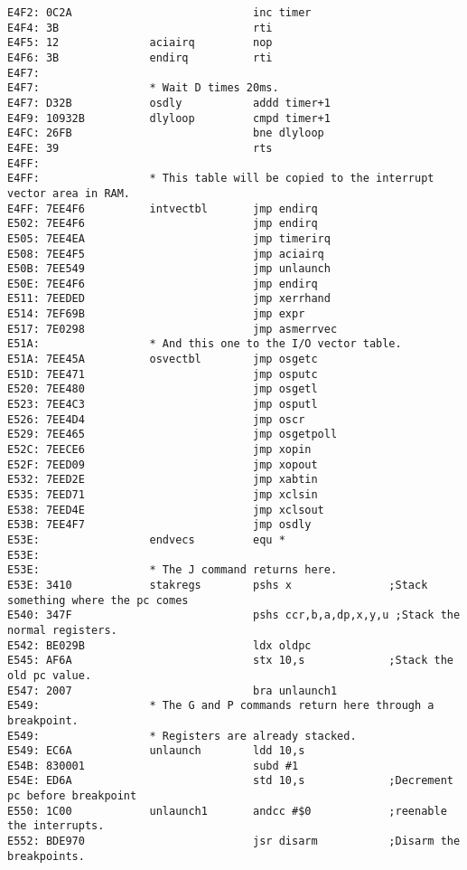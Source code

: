 {\begin{verbatim}
E4F2: 0C2A                            inc timer
E4F4: 3B                              rti
E4F5: 12              aciairq         nop
E4F6: 3B              endirq          rti
E4F7:                 
E4F7:                 * Wait D times 20ms.
E4F7: D32B            osdly           addd timer+1
E4F9: 10932B          dlyloop         cmpd timer+1
E4FC: 26FB                            bne dlyloop
E4FE: 39                              rts             
E4FF:                 
E4FF:                 * This table will be copied to the interrupt vector area in RAM.
E4FF: 7EE4F6          intvectbl       jmp endirq
E502: 7EE4F6                          jmp endirq
E505: 7EE4EA                          jmp timerirq
E508: 7EE4F5                          jmp aciairq
E50B: 7EE549                          jmp unlaunch
E50E: 7EE4F6                          jmp endirq
E511: 7EEDED                          jmp xerrhand
E514: 7EF69B                          jmp expr
E517: 7E0298                          jmp asmerrvec
E51A:                 * And this one to the I/O vector table.
E51A: 7EE45A          osvectbl        jmp osgetc
E51D: 7EE471                          jmp osputc
E520: 7EE480                          jmp osgetl
E523: 7EE4C3                          jmp osputl
E526: 7EE4D4                          jmp oscr                
E529: 7EE465                          jmp osgetpoll
E52C: 7EECE6                          jmp xopin
E52F: 7EED09                          jmp xopout
E532: 7EED2E                          jmp xabtin
E535: 7EED71                          jmp xclsin
E538: 7EED4E                          jmp xclsout
E53B: 7EE4F7                          jmp osdly
E53E:                 endvecs         equ *           
E53E:                                 
E53E:                 * The J command returns here.
E53E: 3410            stakregs        pshs x               ;Stack something where the pc comes
E540: 347F                            pshs ccr,b,a,dp,x,y,u ;Stack the normal registers.
E542: BE029B                          ldx oldpc       
E545: AF6A                            stx 10,s             ;Stack the old pc value.
E547: 2007                            bra unlaunch1
E549:                 * The G and P commands return here through a breakpoint.
E549:                 * Registers are already stacked.
E549: EC6A            unlaunch        ldd 10,s
E54B: 830001                          subd #1
E54E: ED6A                            std 10,s             ;Decrement pc before breakpoint
E550: 1C00            unlaunch1       andcc #$0            ;reenable the interrupts.
E552: BDE970                          jsr disarm           ;Disarm the breakpoints.

\end{verbatim}}
